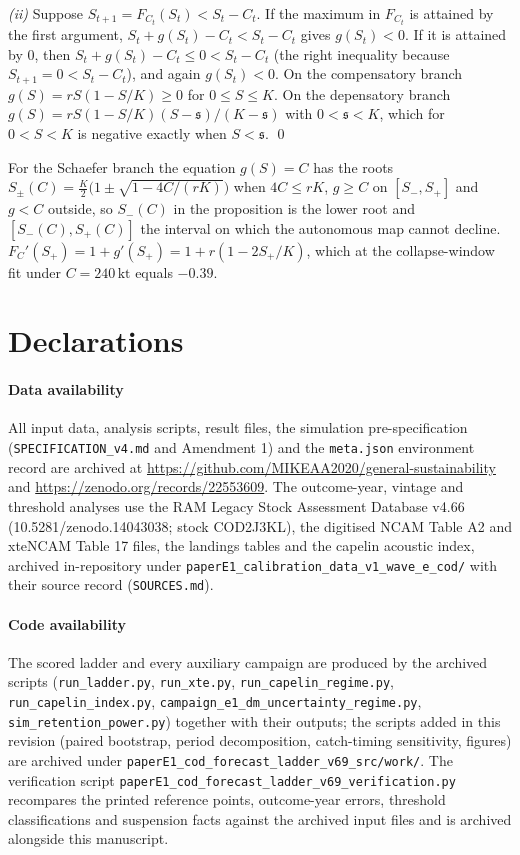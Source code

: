 \documentclass[preprint,11pt,authoryear]{elsarticle}
\theoremstyle{definition}
\theoremstyle{remark}
\newcommand{\kt}{\,\mathrm{kt}}
\newcommand{\sA}{\mathfrak{s}}
\begin{document}
\emph{(ii)} Suppose $S_{t+1} = F_{C_t}(S_t) < S_t - C_t$. If the maximum in $F_{C_t}$ is attained by the first argument, $S_t + g(S_t) - C_t < S_t - C_t$ gives $g(S_t) < 0$. If it is attained by $0$, then $S_t + g(S_t) - C_t \le 0 < S_t - C_t$ (the right inequality because $S_{t+1} = 0 < S_t - C_t$), and again $g(S_t) < 0$. On the compensatory branch $g(S) = rS(1-S/K) \ge 0$ for $0 \le S \le K$. On the depensatory branch $g(S) = rS(1-S/K)(S-\sA)/(K-\sA)$ with $0<\sA<K$, which for $0<S<K$ is negative exactly when $S<\sA$. \qed

For the Schaefer branch the equation $g(S)=C$ has the roots $S_\pm(C) = \tfrac{K}{2}\bigl(1\pm\sqrt{1-4C/(rK)}\bigr)$ when $4C\le rK$, $g\ge C$ on $[S_-,S_+]$ and $g<C$ outside, so $S_-(C)$ in the proposition is the lower root and $[S_-(C),S_+(C)]$ the interval on which the autonomous map cannot decline. $F_C'(S_+) = 1 + g'(S_+) = 1 + r(1-2S_+/K)$, which at the collapse-window fit under $C=240\kt$ equals $-0.39$.

\section*{Declarations}

\paragraph{Data availability} All input data, analysis scripts, result files, the simulation pre-specification (\texttt{SPECIFICATION\_v4.md} and Amendment 1) and the \texttt{meta.json} environment record are archived at \url{https://github.com/MIKEAA2020/general-sustainability} and \url{https://zenodo.org/records/22553609}. The outcome-year, vintage and threshold analyses use the RAM Legacy Stock Assessment Database v4.66 (10.5281/zenodo.14043038; stock COD2J3KL), the digitised NCAM Table A2 and xteNCAM Table 17 files, the landings tables and the capelin acoustic index, archived in-repository under \texttt{paperE1\_calibration\_data\_v1\_wave\_e\_cod/} with their source record (\texttt{SOURCES.md}).

\paragraph{Code availability} The scored ladder and every auxiliary campaign are produced by the archived scripts (\texttt{run\_ladder.py}, \texttt{run\_xte.py}, \texttt{run\_capelin\_regime.py}, \texttt{run\_capelin\_index.py}, \texttt{campaign\_e1\_dm\_uncertainty\_regime.py}, \texttt{sim\_retention\_power.py}) together with their outputs; the scripts added in this revision (paired bootstrap, period decomposition, catch-timing sensitivity, figures) are archived under \texttt{paperE1\_cod\_forecast\_ladder\_v69\_src/work/}. The verification script \texttt{paperE1\_cod\_forecast\_ladder\_v69\_verification.py} recompares the printed reference points, outcome-year errors, threshold classifications and suspension facts against the archived input files and is archived alongside this manuscript.
\end{document}
